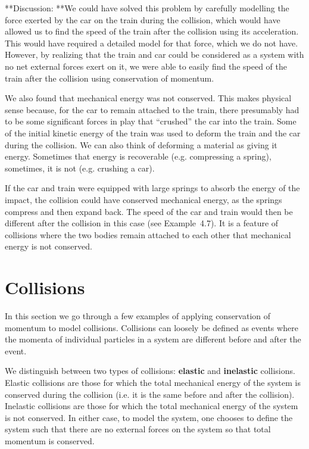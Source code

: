 \documentclass[9pt,arxiv,red]{lapreprint}
\begin{document}
\begin{framed}
\begin{framed}
**Discussion: **We could have solved this problem by carefully modelling the force exerted by the car on the train during the collision, which would have allowed us to find the speed of the train after the collision using its acceleration. This would have required a detailed model for that force, which we do not have. However, by realizing that the train and car could be considered as a system with no net external forces exert on it, we were able to easily find the speed of the train after the collision using conservation of momentum.

We also found that mechanical energy was not conserved. This makes physical sense because, for the car to remain attached to the train, there presumably had to be some significant forces in play that ``crushed'' the car into the train. Some of the initial kinetic energy of the train was used to deform the train and the car during the collision. We can also think of deforming a material as giving it energy. Sometimes that energy is recoverable (e.g. compressing a spring), sometimes, it is not (e.g. crushing a car).

If the car and train were equipped with large springs to absorb the energy of the impact, the collision could have conserved mechanical energy, as the springs compress and then expand back. The speed of the car and train would then be different after the collision in this case (see Example~4.7). It is a feature of collisions where the two bodies remain attached to each other that mechanical energy is not conserved.
\end{framed}
\end{framed}

\section{Collisions}

In this section we go through a few examples of applying conservation of momentum to model collisions. Collisions can loosely be defined as events where the momenta of individual particles in a system are different before and after the event.

We distinguish between two types of collisions: \textbf{elastic} and \textbf{inelastic} collisions. Elastic collisions are those for which the total mechanical energy of the system is conserved during the collision (i.e. it is the same before and after the collision). Inelastic collisions are those for which the total mechanical energy of the system is not conserved. In either case, to model the system, one chooses to define the system such that there are no external forces on the system so that total momentum is conserved.
\end{document}
